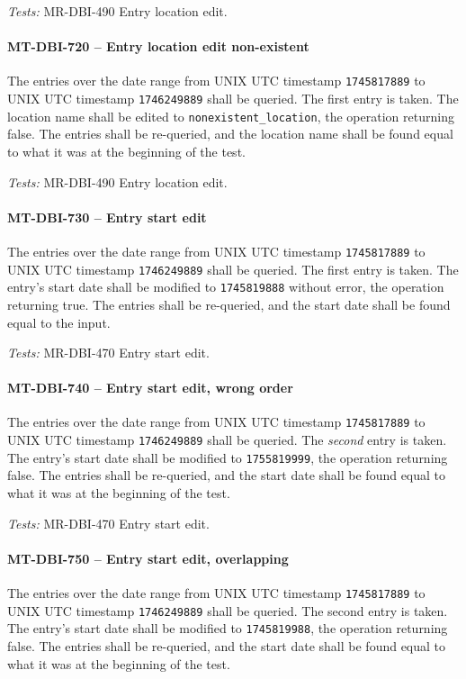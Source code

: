 \textit{Tests: } MR-DBI-490 Entry location edit.

\paragraph{MT-DBI-720 -- Entry location edit non-existent}
The entries over the date range from UNIX UTC timestamp
\lstinline{1745817889} to UNIX UTC timestamp \lstinline{1746249889}
shall be queried. The first entry is taken.
The location name shall be edited to \lstinline{nonexistent_location},
the operation returning false.
The entries shall be re-queried, and the location name shall be
found equal to what it was at the beginning of the test.

\textit{Tests: } MR-DBI-490 Entry location edit.

\paragraph{MT-DBI-730 -- Entry start edit}
The entries over the date range from UNIX UTC timestamp
\lstinline{1745817889} to UNIX UTC timestamp \lstinline{1746249889}
shall be queried. The first entry is taken.
The entry's start date shall be modified to \lstinline{1745819888}
without error, the operation returning true.
The entries shall be re-queried, and the start date shall be
found equal to the input.

\textit{Tests: } MR-DBI-470 Entry start edit.

\paragraph{MT-DBI-740 -- Entry start edit, wrong order}
The entries over the date range from UNIX UTC timestamp
\lstinline{1745817889} to UNIX UTC timestamp \lstinline{1746249889}
shall be queried. The \emph{second} entry is taken.
The entry's start date shall be modified to \lstinline{1755819999},
the operation returning false.
The entries shall be re-queried, and the start date shall be
found equal to what it was at the beginning of the test.

\textit{Tests: } MR-DBI-470 Entry start edit.

\paragraph{MT-DBI-750 -- Entry start edit, overlapping}
The entries over the date range from UNIX UTC timestamp
\lstinline{1745817889} to UNIX UTC timestamp \lstinline{1746249889}
shall be queried. The second entry is taken.
The entry's start date shall be modified to \lstinline{1745819988},
the operation returning false.
The entries shall be re-queried, and the start date shall be
found equal to what it was at the beginning of the test.

